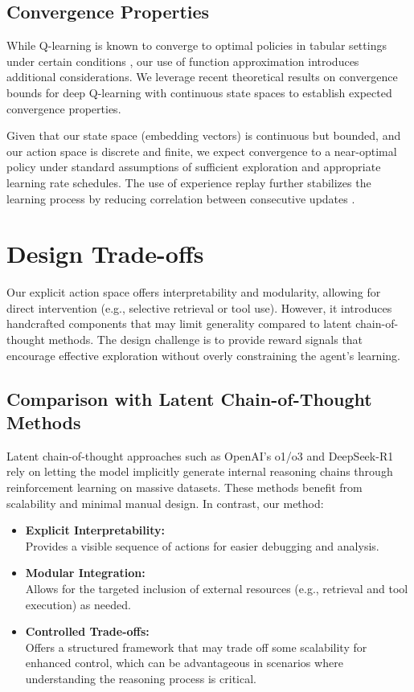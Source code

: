 \documentclass[10pt,journal,compsoc]{IEEEtran}
\begin{document}
\subsection{Convergence Properties}

While Q-learning is known to converge to optimal policies in tabular settings under certain conditions \citep{watkins1992q}, our use of function approximation introduces additional considerations. We leverage recent theoretical results on convergence bounds for deep Q-learning with continuous state spaces \citep{fan2020theoretical} to establish expected convergence properties.

Given that our state space (embedding vectors) is continuous but bounded, and our action space is discrete and finite, we expect convergence to a near-optimal policy under standard assumptions of sufficient exploration and appropriate learning rate schedules. The use of experience replay further stabilizes the learning process by reducing correlation between consecutive updates \citep{mnih2015human}.

\section{Design Trade-offs}

Our explicit action space offers interpretability and modularity,
allowing for direct intervention (e.g., selective retrieval or tool
use). However, it introduces handcrafted components that may limit
generality compared to latent chain-of-thought methods. The design
challenge is to provide reward signals that encourage effective
exploration without overly constraining the agent's learning.

\subsection{Comparison with Latent Chain-of-Thought Methods}

Latent chain-of-thought approaches such as OpenAI's o1/o3 and
DeepSeek-R1 rely on letting the model implicitly generate internal
reasoning chains through reinforcement learning on massive datasets.
These methods benefit from scalability and minimal manual design. In
contrast, our method:

\begin{itemize}
\item
  \textbf{Explicit Interpretability:}\\
  Provides a visible sequence of actions for easier debugging and
  analysis.
\item
  \textbf{Modular Integration:}\\
  Allows for the targeted inclusion of external resources (e.g.,
  retrieval and tool execution) as needed.
\item
  \textbf{Controlled Trade-offs:}\\
  Offers a structured framework that may trade off some scalability for
  enhanced control, which can be advantageous in scenarios where
  understanding the reasoning process is critical.
\end{itemize}
\end{document}
